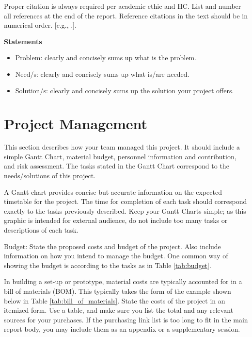 \documentclass[10pt]{article}
\begin{document}
  Proper citation is always required per academic ethic and HC. List and number all
  references at the end of the report. Reference citations in the text should be
  in numerical order. [e.g., \citep{brandis2016nonequi}.].

  \textbf{Statements}
  \begin{itemize}
    \item Problem: clearly and concisely sums up what is the problem.

    \item Need/s: clearly and concisely sums up what is/are needed.

    \item Solution/s: clearly and concisely sums up the solution your project
      offers.
  \end{itemize}

  \section{Project Management}

  This section describes how your team managed this project. It should include a
  simple Gantt Chart, material budget, personnel information and contribution,
  and risk assessment. The tasks stated in the Gantt Chart correspond to the needs/solutions
  of this project.

  A Gantt chart provides concise but accurate information on the expected timetable
  for the project. The time for completion of each task should correspond
  exactly to the tasks previously described. Keep your Gantt Charts simple; as
  this graphic is intended for external audience, do not include too many tasks or
  descriptions of each task.

  Budget: State the proposed costs and budget of the project. Also include information
  on how you intend to manage the budget. One common way of showing the budget
  is according to the tasks as in Table \ref{tab:budget}.

  In building a set-up or prototype, material costs are typically accounted for in
  a bill of materials (BOM). This typically takes the form of the example shown
  below in Table \ref{tab:bill_of_materials}. State the costs of the project in an
  itemized form. Use a table, and make sure you list the total and any relevant sources
  for your purchases. If the purchasing link list is too long to fit in the main
  report body, you may include them as an appendix or a supplementary session.
\end{document}
